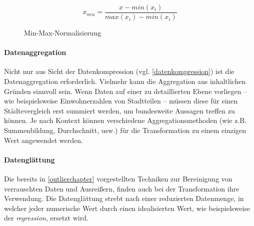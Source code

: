 \begin{figure}[H]
\begin{equation}
x_{neu} = \frac{x - min(x_i)}{max(x_i) - min(x_i)}
\end{equation}
\caption{Min-Max-Normalisierung}
\label{minmax}
\end{figure}

\paragraph{Datenaggregation}
Nicht nur aus Sicht der Datenkompression (vgl. \vref{datenkompression}) ist die Datenaggregation erforderlich. Vielmehr \glqq kann die Aggregation aus inhaltlichen Gründen sinnvoll sein.\grqq{} Wenn Daten auf einer zu detaillierten Ebene vorliegen -- wie beispielsweise Einwohnerzahlen von Stadtteilen -- müssen diese für einen Städtevergleich erst summiert werden, um bundesweite Aussagen treffen zu können. Je nach Kontext können verschiedene Aggregationsmethoden (wie z.B. Summenbildung, Durchschnitt, usw.) für die Transformation zu einem einzigen Wert angewendet werden.

\paragraph{Datenglättung}
Die bereits in \vref{outlierchapter} vorgestellten Techniken zur Bereinigung von verrauschten Daten und Ausreißern, finden auch bei der Transformation ihre Verwendung. Die Datenglättung strebt nach einer reduzierten Datenmenge, in welcher jeder numerische Wert durch einen idealisierten Wert, wie beispielsweise der \textit{\gls{regression}}, ersetzt wird.